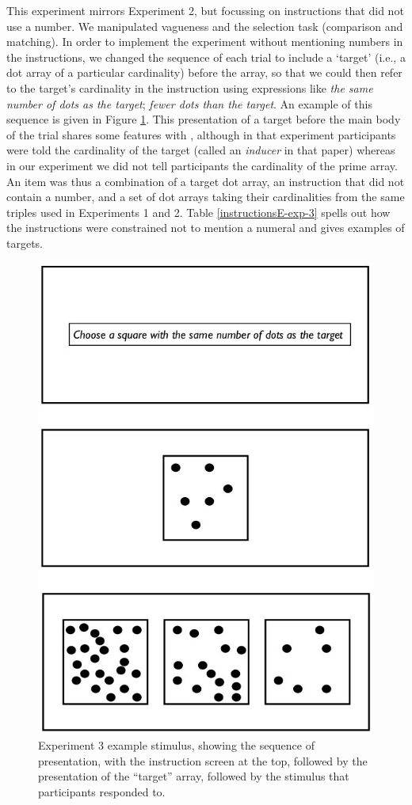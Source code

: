 
This experiment mirrors Experiment 2, but focussing on instructions that did not use a number. We manipulated vagueness and the selection task (comparison and matching). In order to implement the experiment without mentioning numbers in the instructions, we changed the sequence of each trial to include a `target' (i.e., a dot array of a particular cardinality) before the array, so that we could then refer to the target's cardinality in the instruction using expressions like \emph{the same number of dots as the target}; \emph{fewer dots than the target}. An example of this sequence is given in Figure \ref{Experiment3examplestimulus}. This presentation of a target before the main body of the trial shares some features with \citeauthor[Experiment 2]{Izard20081221}, although in that experiment participants were told the cardinality of the target (called an \emph{inducer} in that paper) whereas in our experiment we did not tell participants the cardinality of the prime array. An item was thus a combination of a target dot array, an instruction that did not contain a number, and a set of dot arrays taking their cardinalities from the same triples used in Experiments 1 and 2. Table \ref{instructionsE-exp-3} spells out how the instructions were constrained not to mention a numeral and gives examples of targets.

\begin{figure}[htbp]
\centering
\includegraphics[width=.5\textwidth]{figures/Ee3-flow.jpg}
\caption{Experiment 3 example stimulus, showing the sequence of presentation, with the instruction screen at the top, followed by the presentation of the ``target'' array, followed by the stimulus that participants responded to.}
\label{Experiment3examplestimulus}
\end{figure}


